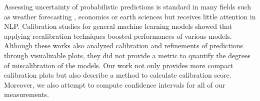 Assessing uncertainty of probabilistic predictions is standard in many fields such as weather forecasting \citep{murphy1993good}, economics \citep{canova1994statistical, cooley1997calibrated} or earth sciences \citep{oreskes1994verification} but receives little attention in NLP. Calibration studies for general machine learning models \cite{niculescu2005predicting, caruana2006empirical} showed that applying recalibration techniques boosted performances of various models. Although these works also analyzed calibration and refinements of predictions through visualizable plots, they did not provide a metric to quantify the degrees of miscalibration of the models. Our work not only provides more compact calibration plots but also describe a method to calculate calibration score. Moreover, we also attempt to compute confidence intervals for all of our measurements.  




